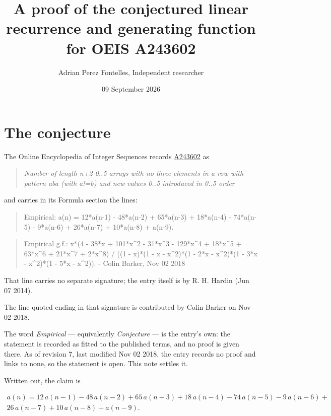 \documentclass[11pt]{article}
\title{A proof of the conjectured linear recurrence and generating function for OEIS A243602}
\author{Adrian Perez Fontelles, Independent researcher}
\date{09 September 2026}
\theoremstyle{definition}
\begin{document}
\maketitle
\section{The conjecture}

The Online Encyclopedia of Integer Sequences records \href{https://oeis.org/A243602}{A243602} as

\begin{quote}\itshape Number of length n+2 0..5 arrays with no three elements in a row with pattern aba (with a!=b) and new values 0..5 introduced in 0..5 order\end{quote}

and carries in its Formula section the lines:

\begin{quote}\ttfamily Empirical: a(n) = 12*a(n-1) - 48*a(n-2) + 65*a(n-3) + 18*a(n-4) - 74*a(n-5) - 9*a(n-6) + 26*a(n-7) + 10*a(n-8) + a(n-9).\end{quote}

\begin{quote}\ttfamily Empirical g.f.: x*(4 - 38*x + 101*x\textasciicircum{}2 - 31*x\textasciicircum{}3 - 129*x\textasciicircum{}4 + 18*x\textasciicircum{}5 + 63*x\textasciicircum{}6 + 21*x\textasciicircum{}7 + 2*x\textasciicircum{}8) / ((1 - x)*(1 - x - x\textasciicircum{}2)*(1 - 2*x - x\textasciicircum{}2)*(1 - 3*x - x\textasciicircum{}2)*(1 - 5*x - x\textasciicircum{}2)). - Colin Barker, Nov 02 2018\end{quote}

That line carries no separate signature; the entry itself is by R. H. Hardin (Jun 07 2014).

The line quoted ending in that signature is contributed by Colin Barker on Nov 02 2018.

The word {\itshape Empirical} --- equivalently {\itshape Conjecture} --- is the entry's own: the statement is recorded as fitted to the published terms, and no proof is given there. As of revision 7, last modified Nov 02 2018, the entry records no proof and links to none, so the statement is open. This note settles it.

Written out, the claim is

\begin{multline*} a(n) = 12\,a(n-1) - 48\,a(n-2) + 65\,a(n-3) + 18\,a(n-4) - 74\,a(n-5) - 9\,a(n-6) + \\ 26\,a(n-7) + 10\,a(n-8) + a(n-9). \end{multline*}
\end{document}
